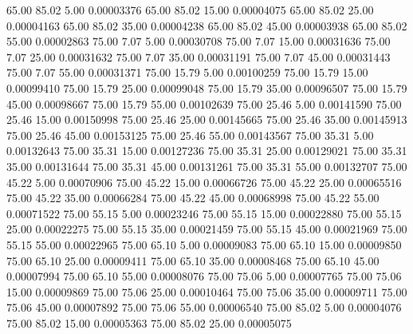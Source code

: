      65.00     85.02      5.00     0.00003376
     65.00     85.02     15.00     0.00004075
     65.00     85.02     25.00     0.00004163
     65.00     85.02     35.00     0.00004238
     65.00     85.02     45.00     0.00003938
     65.00     85.02     55.00     0.00002863
     75.00      7.07      5.00     0.00030708
     75.00      7.07     15.00     0.00031636
     75.00      7.07     25.00     0.00031632
     75.00      7.07     35.00     0.00031191
     75.00      7.07     45.00     0.00031443
     75.00      7.07     55.00     0.00031371
     75.00     15.79      5.00     0.00100259
     75.00     15.79     15.00     0.00099410
     75.00     15.79     25.00     0.00099048
     75.00     15.79     35.00     0.00096507
     75.00     15.79     45.00     0.00098667
     75.00     15.79     55.00     0.00102639
     75.00     25.46      5.00     0.00141590
     75.00     25.46     15.00     0.00150998
     75.00     25.46     25.00     0.00145665
     75.00     25.46     35.00     0.00145913
     75.00     25.46     45.00     0.00153125
     75.00     25.46     55.00     0.00143567
     75.00     35.31      5.00     0.00132643
     75.00     35.31     15.00     0.00127236
     75.00     35.31     25.00     0.00129021
     75.00     35.31     35.00     0.00131644
     75.00     35.31     45.00     0.00131261
     75.00     35.31     55.00     0.00132707
     75.00     45.22      5.00     0.00070906
     75.00     45.22     15.00     0.00066726
     75.00     45.22     25.00     0.00065516
     75.00     45.22     35.00     0.00066284
     75.00     45.22     45.00     0.00068998
     75.00     45.22     55.00     0.00071522
     75.00     55.15      5.00     0.00023246
     75.00     55.15     15.00     0.00022880
     75.00     55.15     25.00     0.00022275
     75.00     55.15     35.00     0.00021459
     75.00     55.15     45.00     0.00021969
     75.00     55.15     55.00     0.00022965
     75.00     65.10      5.00     0.00009083
     75.00     65.10     15.00     0.00009850
     75.00     65.10     25.00     0.00009411
     75.00     65.10     35.00     0.00008468
     75.00     65.10     45.00     0.00007994
     75.00     65.10     55.00     0.00008076
     75.00     75.06      5.00     0.00007765
     75.00     75.06     15.00     0.00009869
     75.00     75.06     25.00     0.00010464
     75.00     75.06     35.00     0.00009711
     75.00     75.06     45.00     0.00007892
     75.00     75.06     55.00     0.00006540
     75.00     85.02      5.00     0.00004076
     75.00     85.02     15.00     0.00005363
     75.00     85.02     25.00     0.00005075
